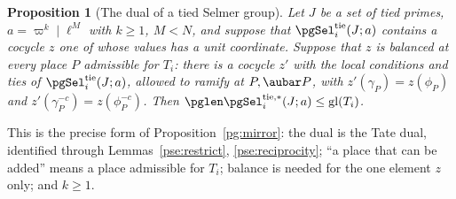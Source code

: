 \documentclass[10pt]{amsart}
\newtheorem{proposition}[theorem]{Proposition}
\theoremstyle{definition}
\theoremstyle{remark}
\begin{document}
\begin{proposition}[The dual of a tied Selmer group]
\label{pse:mirror}
Let $J$ be a set of tied primes, $a=\varpi^k\mid\ell^M$ with $k\ge1$, $M<N$, and suppose that
$\pgSel^{\mathrm{tie}}_i(J;a)$ contains a cocycle $z$ one of whose values has a unit coordinate.
Suppose that $z$ is \emph{balanced} at every place $P$ admissible for $T_i$: there is a cocycle
$z'$ with the local conditions and ties of $\pgSel^{\mathrm{tie}}_i(J;a)$, allowed to ramify at
$P,\aubar P$, with $z'(\gamma_P)=z(\phi_P)$ and $z'(\gamma_P^{-c})=z(\phi_P^{-c})$. Then
$\pglen\pgSel^{\mathrm{tie},*}_i(J;a)\le\mathrm{gl}(T_i)$.
\end{proposition}

This is the precise form of Proposition~\ref{pg:mirror}: the dual is the Tate dual,
identified through Lemmas~\ref{pse:restrict}, \ref{pse:reciprocity}; ``a place that can be added''
means a place admissible for $T_i$; balance is needed for the one element $z$ only; and $k\ge1$.
\end{document}
